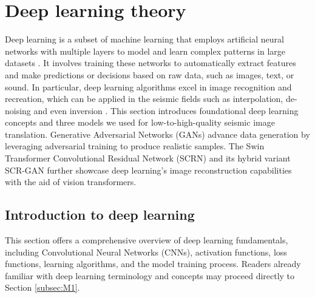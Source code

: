 \section{Deep learning theory}
Deep learning is a subset of machine learning that employs artificial neural networks with multiple layers to model and learn complex patterns in large datasets \cite{dargan2020survey}. It involves training these networks to automatically extract features and make predictions or decisions based on raw data, such as images, text, or sound. In particular, deep learning algorithms excel in image recognition and recreation, which can be applied in the seismic fields such as interpolation, de-noising and even inversion \cite{siahkoohi2018seismic, li2019deep}. This section introduces foundational deep learning concepts and three models we used for low-to-high-quality seismic image translation. Generative Adversarial Networks (GANs) advance data generation by leveraging adversarial training to produce realistic samples. The Swin Transformer Convolutional Residual Network (SCRN) and its hybrid variant SCR-GAN further showcase deep learning's image reconstruction capabilities with the aid of vision transformers.

\subsection{Introduction to deep learning}
This section offers a comprehensive overview of deep learning fundamentals, including Convolutional Neural Networks (CNNs), activation functions, loss functions, learning algorithms, and the model training process. Readers already familiar with deep learning terminology and concepts may proceed directly to Section \ref{subsec:M1}. 

